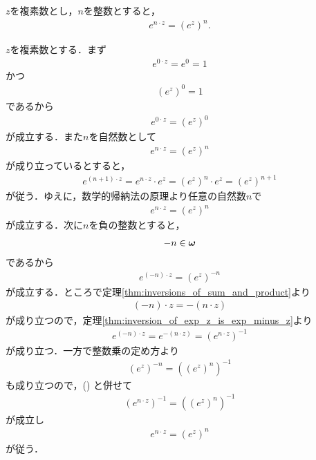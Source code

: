 	\begin{screen}
		\begin{thm}[指数関数の整数乗]
		\label{thm:integer_exponentiation_of_exponential_function}
			$z$を複素数とし，$n$を整数とすると，
			\begin{align}
				e^{n \cdot z} = (e^z)^n.
			\end{align}
		\end{thm}
	\end{screen}
	
	\begin{sketch}
		$z$を複素数とする．まず
		\begin{align}
			e^{0 \cdot z} = e^0 = 1
		\end{align}
		かつ
		\begin{align}
			(e^z)^0 = 1
		\end{align}
		であるから
		\begin{align}
			e^{0 \cdot z} = (e^z)^0
		\end{align}
		が成立する．また$n$を自然数として
		\begin{align}
			e^{n \cdot z} = (e^z)^n
		\end{align}
		が成り立っているとすると，
		\begin{align}
			e^{(n+1) \cdot z}
			= e^{n \cdot z} \cdot e^z
			= (e^z)^n \cdot e^z
			= (e^z)^{n+1}
		\end{align}
		が従う．ゆえに，数学的帰納法の原理より任意の自然数$n$で
		\begin{align}
			e^{n \cdot z} = (e^z)^n
		\end{align}
		が成立する．次に$n$を負の整数とすると，
		\begin{align}
			-n \in {\boldsymbol \omega}
		\end{align}
		であるから
		\begin{align}
			e^{(-n) \cdot z} = (e^z)^{-n}
			\label{fom:thm_integer_exponentiation_of_exponential_function}
		\end{align}
		が成立する．ところで定理\ref{thm:inversions_of_sum_and_product}より
		\begin{align}
			(-n) \cdot z = -(n \cdot z)
		\end{align}
		が成り立つので，定理\ref{thm:inversion_of_exp_z_is_exp_minus_z}より
		\begin{align}
			e^{(-n) \cdot z} = e^{-(n \cdot z)} = (e^{n \cdot z})^{-1}
		\end{align}
		が成り立つ．一方で整数乗の定め方より
		\begin{align}
			(e^z)^{-n} = ((e^z)^n)^{-1}
		\end{align}
		も成り立つので，()
		と併せて
		\begin{align}
			(e^{n \cdot z})^{-1} = ((e^z)^n)^{-1}
		\end{align}
		が成立し
		\begin{align}
			e^{n \cdot z} = (e^z)^n
		\end{align}
		が従う．
		\QED
	\end{sketch}